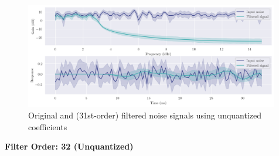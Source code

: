 \begin{figure}[!ht]
    \centering
    \includegraphics[width=0.99\textwidth]{images/q8_31th_stability.png}
    \caption{Original and (31st-order) filtered noise signals using unquantized coefficients}
\end{figure}

\newpage
{\Large\textbf{Filter Order: 32 (Unquantized)}}
\vspace{1em}

